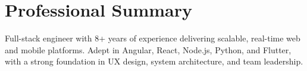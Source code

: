 \section{Professional Summary}
\noindent \normalsize Full-stack engineer with 8+ years of experience delivering scalable, real-time web and mobile platforms. Adept in Angular, React, Node.js, Python, and Flutter, with a strong foundation in UX design, system architecture, and team leadership.
\nopagebreak[4]